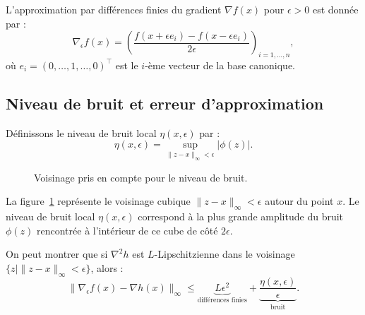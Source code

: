L'approximation par différences finies du gradient $\nabla f(x)$ pour $\epsilon > 0$ est donnée par :
\[
    \nabla_\epsilon f(x) = \left( \frac{f(x+\epsilon e_i) - f(x-\epsilon e_i)}{2\epsilon} \right)_{i=1,\dots,n},
\]
où $e_i = (0, \dots, 1, \dots, 0)^\top$ est le $i$-ème vecteur de la base canonique.

\subsection{Niveau de bruit et erreur d'approximation}

Définissons le niveau de bruit local $\eta(x, \epsilon)$ par :
\begin{equation}
    \eta(x, \epsilon) = \sup_{\|z-x\|_\infty < \epsilon} |\phi(z)|.
\end{equation}

\begin{figure}[H]
\centering
{}
\caption{Voisinage pris en compte pour le niveau de bruit.}
\label{fig:noise-cube}
\end{figure}

\begin{figureexplanation}
La figure~\ref{fig:noise-cube} représente le voisinage cubique $\|z - x\|_\infty < \epsilon$ autour du point $x$. Le niveau de bruit local $\eta(x, \epsilon)$ correspond à la plus grande amplitude du bruit $\phi(z)$ rencontrée à l'intérieur de ce cube de côté $2\epsilon$.
\end{figureexplanation}

On peut montrer que si $\nabla^2 h$ est $L$-Lipschitzienne dans le voisinage $\{z \mid \|z-x\|_\infty < \epsilon\}$, alors :
\begin{equation}
    \|\nabla_\epsilon f(x) - \nabla h(x)\|_\infty \le \underbrace{L \epsilon^2}_{\text{différences finies}} + \underbrace{\frac{\eta(x, \epsilon)}{\epsilon}}_{\text{bruit}}.
\end{equation}

